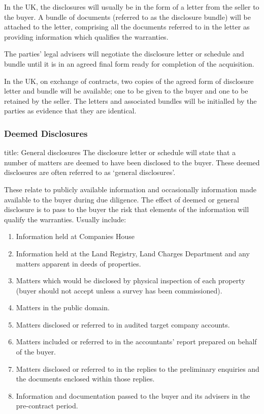 \documentclass[
]{article}
\newenvironment{Shaded}{}{}
\newcommand{\NormalTok}[1]{#1}
\providecommand{\tightlist}{%
  \setlength{\itemsep}{0pt}\setlength{\parskip}{0pt}}
\begin{document}
In the UK, the disclosures will usually be in the form of a letter from
the seller to the buyer. A bundle of documents (referred to as the
disclosure bundle) will be attached to the letter, comprising all the
documents referred to in the letter as providing information which
qualifies the warranties.

The parties' legal advisers will negotiate the disclosure letter or
schedule and bundle until it is in an agreed final form ready for
completion of the acquisition.

In the UK, on exchange of contracts, two copies of the agreed form of
disclosure letter and bundle will be available; one to be given to the
buyer and one to be retained by the seller. The letters and associated
bundles will be initialled by the parties as evidence that they are
identical.

\hypertarget{deemed-disclosures}{%
\subsubsection{Deemed Disclosures}\label{deemed-disclosures}}

\begin{Shaded}
\begin{Highlighting}[]
\NormalTok{title: General disclosures}
\NormalTok{The disclosure letter or schedule will state that a number of matters are deemed to have been disclosed to the buyer. These deemed disclosures are often referred to as ‘general disclosures’.}
\end{Highlighting}
\end{Shaded}

These relate to publicly available information and occasionally
information made available to the buyer during due diligence. The effect
of deemed or general disclosure is to pass to the buyer the risk that
elements of the information will qualify the warranties. Usually
include:

\begin{enumerate}
\def\labelenumi{\arabic{enumi}.}
\tightlist
\item
  Information held at Companies House
\item
  Information held at the Land Registry, Land Charges Department and any
  matters apparent in deeds of properties.
\item
  Matters which would be disclosed by physical inspection of each
  property (buyer should not accept unless a survey has been
  commissioned).
\item
  Matters in the public domain.
\item
  Matters disclosed or referred to in audited target company accounts.
\item
  Matters included or referred to in the accountants' report prepared on
  behalf of the buyer.
\item
  Matters disclosed or referred to in the replies to the preliminary
  enquiries and the documents enclosed within those replies.
\item
  Information and documentation passed to the buyer and its advisers in
  the pre-contract period.
\end{enumerate}
\end{document}
